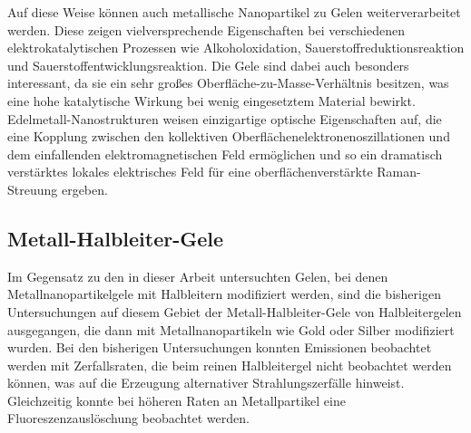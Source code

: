     Auf diese Weise können auch metallische Nanopartikel zu Gelen weiterverarbeitet werden. \autocite{Bigall2009}
    Diese zeigen vielversprechende Eigenschaften bei verschiedenen elektrokatalytischen Prozessen wie Alkoholoxidation, Sauerstoffreduktionsreaktion und Sauerstoffentwicklungsreaktion.  \autocite{Cai2018,Shi2018,Zhu2016,Shi2017,Wang2019}
    Die Gele sind dabei auch besonders interessant, da sie ein sehr großes Oberfläche-zu-Masse-Verhältnis besitzen, was eine hohe katalytische Wirkung bei wenig eingesetztem Material bewirkt. 
    Edelmetall-Nanostrukturen weisen einzigartige optische Eigenschaften auf, die eine Kopplung zwischen den kollektiven Oberflächenelektronenoszillationen und dem einfallenden elektromagnetischen Feld ermöglichen und so ein dramatisch verstärktes lokales elektrisches Feld für eine oberflächenverstärkte Raman-Streuung ergeben. \autocite{Linic2015,Gao2016}

    
    \subsection{Metall-Halbleiter-Gele}
    Im Gegensatz zu den in dieser Arbeit untersuchten Gelen, bei denen Metallnanopartikelgele mit Halbleitern modifiziert werden, sind die bisherigen Untersuchungen auf diesem Gebiet der Metall-Halbleiter-Gele von Halbleitergelen ausgegangen, die dann mit Metallnanopartikeln wie Gold oder Silber modifiziert wurden. \autocite{Nahar2015,Lesnyak2011} 
    Bei den bisherigen Untersuchungen konnten Emissionen beobachtet werden mit Zerfallsraten,  die beim reinen Halbleitergel nicht beobachtet werden können, was auf die Erzeugung alternativer Strahlungszerfälle hinweist. \autocite{Nahar2015}
    Gleichzeitig konnte bei höheren Raten an Metallpartikel eine Fluoreszenzauslöschung beobachtet werden. \autocite{Lesnyak2011}
    